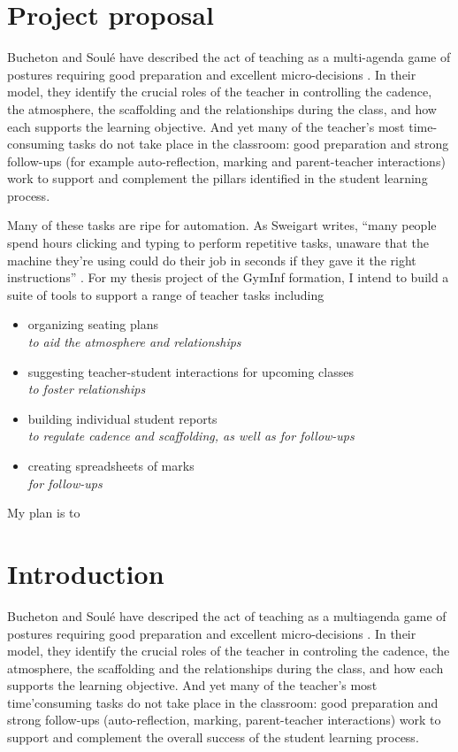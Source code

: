 \documentclass[10pt]{article}
\begin{document}
\section{Project proposal}

Bucheton and Soulé have described the act of teaching as a multi-agenda game of postures requiring good preparation and excellent micro-decisions \cite{BS09}. In their model, they identify the crucial roles of the teacher in controlling the cadence, the atmosphere, the scaffolding and the relationships during the class, and how each supports the learning objective. And yet many of the teacher's most time-consuming tasks do not take place in the classroom: good preparation and strong follow-ups (for example auto-reflection, marking and parent-teacher interactions) work to support and complement the pillars identified in the student learning process.

Many of these tasks are ripe for automation. As Sweigart writes, ``many people spend hours clicking and typing to perform repetitive tasks, unaware that the machine they’re using could do their job in seconds if they gave it the right instructions'' \cite{Swei15}.  For my thesis project of the GymInf formation, I intend to build a suite of tools to support a range of teacher tasks including 
\begin{itemize} 
\item organizing seating plans \\
\emph{to aid the atmosphere and relationships} 
\item suggesting teacher-student interactions for upcoming classes \\
\emph{to foster relationships}
\item building individual student reports \\
\emph{to regulate cadence and scaffolding, as well as for follow-ups}
\item creating spreadsheets of marks \\
\emph{for follow-ups}
\end{itemize}

My plan is to 


\section{Introduction}

Bucheton and Soulé have descriped the act of teaching as a multiagenda game of postures requiring good preparation and excellent micro-decisions \cite{BS09}. In their model, they identify the crucial roles of the teacher in controling the cadence, the atmosphere, the scaffolding and the relationships during the class, and how each supports the learning objective. And yet many of the teacher's most time'consuming tasks do not take place in the classroom: good preparation and strong follow-ups (auto-reflection, marking, parent-teacher interactions) work to support and complement the overall success of the student learning process.
\end{document}
